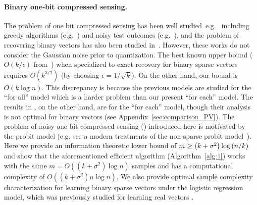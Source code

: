 \paragraph{Binary one-bit compressed sensing.} The problem of  one bit compressed sensing has been well studied~e.g.~\cite{DBLP:conf/ciss/BoufounosB08,jacques2013robust} including greedy algorithms (e.g.~\cite{liu2016one}) and noisy test outcomes (e.g.~\cite{matsumoto2024robust}), and the problem of recovering binary vectors has also been studied in~\cite{acharya2017improved,mazumdar2022support}. However, these works do not consider the Gaussian noise prior to quantization. The best known upper bound ($O(k/\epsilon)$ from~\cite{matsumoto2022binary}) when specialized to exact recovery for binary sparse vectors requires $O(k^{3/2})$ (by choosing $\epsilon = 1/\sqrt{k}$). On the other hand, our bound is $O(k\log{n})$. This discrepancy is because the previous models are studied for the ``for all'' model which is a harder problem than our present ``for each'' model. The results in \cite{vershyninPlan}, on the other hand, are for the ``for each'' model, though their analysis is not optimal for binary vectors (see Appendix~\ref{sec:comparison_PV}). The problem of noisy one bit compressed sensing (\bcs) introduced here is motivated by the probit model (e.g. see a modern treatments of the non-sparse probit model~\cite{kuchelmeister2024finite}). Here we provide an information theoretic lower bound of $m\geq \left(k+\sigma^2\right)\log\left(n/k\right)$ and show that the aforementioned efficient algorithm  (Algorithm~\ref{alg:1}) works with the same $m =O((k+\sigma^2)\log{n})$ samples and has a computational complexity of $O((k+\sigma^2)n\log{n})$. We also provide optimal sample complexity characterization for learning binary sparse vectors under the logistic regression model, which was previously studied for learning real vectors \cite{hsu2024sample,vershyninPlan}.

